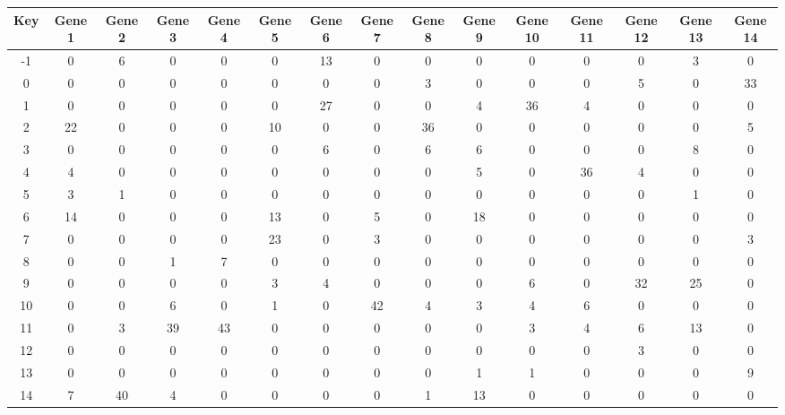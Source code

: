 \begin{tabular}{|c|c|c|c|c|c|c|c|c|c|c|c|c|c|c|}
\hline
Key & Gene 1 & Gene 2 & Gene 3 & Gene 4 & Gene 5 & Gene 6 & Gene 7 & Gene 8 & Gene 9 & Gene 10 & Gene 11 & Gene 12 & Gene 13 & Gene 14 \\
\hline
-1 & 0 & 6 & 0 & 0 & 0 & 13 & 0 & 0 & 0 & 0 & 0 & 0 & 3 & 0 \\
0 & 0 & 0 & 0 & 0 & 0 & 0 & 0 & 3 & 0 & 0 & 0 & 5 & 0 & 33 \\
1 & 0 & 0 & 0 & 0 & 0 & 27 & 0 & 0 & 4 & 36 & 4 & 0 & 0 & 0 \\
2 & 22 & 0 & 0 & 0 & 10 & 0 & 0 & 36 & 0 & 0 & 0 & 0 & 0 & 5 \\
3 & 0 & 0 & 0 & 0 & 0 & 6 & 0 & 6 & 6 & 0 & 0 & 0 & 8 & 0 \\
4 & 4 & 0 & 0 & 0 & 0 & 0 & 0 & 0 & 5 & 0 & 36 & 4 & 0 & 0 \\
5 & 3 & 1 & 0 & 0 & 0 & 0 & 0 & 0 & 0 & 0 & 0 & 0 & 1 & 0 \\
6 & 14 & 0 & 0 & 0 & 13 & 0 & 5 & 0 & 18 & 0 & 0 & 0 & 0 & 0 \\
7 & 0 & 0 & 0 & 0 & 23 & 0 & 3 & 0 & 0 & 0 & 0 & 0 & 0 & 3 \\
8 & 0 & 0 & 1 & 7 & 0 & 0 & 0 & 0 & 0 & 0 & 0 & 0 & 0 & 0 \\
9 & 0 & 0 & 0 & 0 & 3 & 4 & 0 & 0 & 0 & 6 & 0 & 32 & 25 & 0 \\
10 & 0 & 0 & 6 & 0 & 1 & 0 & 42 & 4 & 3 & 4 & 6 & 0 & 0 & 0 \\
11 & 0 & 3 & 39 & 43 & 0 & 0 & 0 & 0 & 0 & 3 & 4 & 6 & 13 & 0 \\
12 & 0 & 0 & 0 & 0 & 0 & 0 & 0 & 0 & 0 & 0 & 0 & 3 & 0 & 0 \\
13 & 0 & 0 & 0 & 0 & 0 & 0 & 0 & 0 & 1 & 1 & 0 & 0 & 0 & 9 \\
14 & 7 & 40 & 4 & 0 & 0 & 0 & 0 & 1 & 13 & 0 & 0 & 0 & 0 & 0 \\
\hline
\end{tabular}